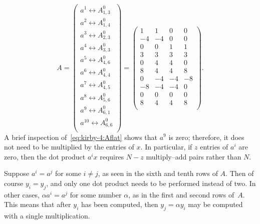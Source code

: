 \begin{equation} \label{eq:kirby-4:Aflat}
A =
\left(
\begin{array}{c}
  a^1 \leftrightarrow A^0_{1,3} \\
  a^2 \leftrightarrow A^0_{1,4} \\
  a^3 \leftrightarrow A^0_{2,3} \\
  a^4 \leftrightarrow A^0_{3,3} \\
  a^5 \leftrightarrow A^0_{4,6} \\
  a^6 \leftrightarrow A^0_{4,4} \\
  a^7 \leftrightarrow A^0_{4,5} \\
  a^8 \leftrightarrow A^0_{5,6} \\
  a^9 \leftrightarrow A^0_{6,1} \\
  a^{10} \leftrightarrow A^0_{6,6} \\
\end{array}
\right)
 =
\left(
\begin{array}{cccc}
1 & 1 & 0 & 0 \\
-4 & -4 & 0 & 0 \\
0 & 0 & 1 & 1 \\
3 & 3 & 3 & 3 \\
0 & 4 & 4 & 0 \\
8 & 4 & 4 & 8 \\
0 & -4 & -4 & -8 \\
-8 & -4 & -4 & 0 \\
 0 & 0 & 0 & 0 \\
8 & 4 & 4 & 8 \\
\end{array}
\right).
\end{equation}
%
A brief inspection of~\eqref{eq:kirby-4:Aflat} shows that $ a^9 $ is
zero; therefore, it does not need to be multiplied by the entries of $
x $. In particular, if $ z $ entries of $ a^i $ are zero, then the dot
product $ a^i x $ requires $ N - z $ multiply--add pairs rather than $
N $.

Suppose $ a^i = a^j $ for some $ i \neq j $, as seen in the sixth and
tenth rows of $ A $.  Then of course $ y_i = y_j $, and only one dot
product needs to be performed instead of two. In other cases, $ \alpha
a^i = a^j $ for some number $ \alpha $, as in the first and second
rows of~$A$. This means that after $ y_i $ has been computed, then $
y_j = \alpha y_i $ may be computed with a single multiplication.

